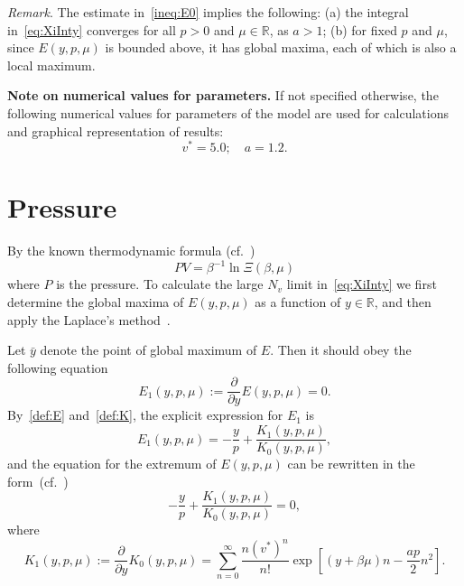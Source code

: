 \documentclass[12pt]{article}
\numberwithin{equation}{section}
\begin{document}
	\textit{Remark}. The estimate in~\eqref{ineq:E0} implies the following: (a) the integral in~\eqref{eq:XiInty} converges for all $p>0$ and $\mu \in \mathbb{R}$, as $a>1$; (b) for fixed $p$ and $\mu$, since $E(y,p,\mu)$ is bounded above, it has global maxima, each of which is also a local maximum.
	
	\textbf{Note on numerical values for parameters.} If not specified otherwise, the following numerical values for parameters of the model are used for calculations and graphical representation of results:
	\begin{equation}
		v^* = 5.0; \quad a = 1.2.
	\end{equation}
	
	
	\section{Pressure}
	By the known thermodynamic formula (cf.~\cite[(2.16)]{KKD20})
	\begin{equation}
		\label{def:eos}
		P V = \beta^{-1} \ln \Xi(\beta, \mu)
	\end{equation}
	where $P$ is the pressure. To calculate the large $N_v$ limit in~\eqref{eq:XiInty} we first determine the global maxima of $E(y,p,\mu)$ as a function of $y \in \mathbb{R}$, and then apply the Laplace's method~\cite{Fedoryuk89}.
	
	Let $\bar{y}$ denote the point of global maximum of $E$. Then it should obey the following equation
	\begin{equation}
		\label{def:E1}
		E_1(y,p,\mu) := \frac{\partial}{\partial y} E(y,p,\mu) = 0.
	\end{equation}
	By~\eqref{def:E} and~\eqref{def:K}, the explicit expression for $E_1$ is
	\begin{equation}
		E_1(y,p,\mu) = -\frac{y}{p} + \frac{K_1(y,p,\mu)}{K_0(y,p,\mu)},
	\end{equation}
	and the equation for the extremum of $E(y,p,\mu)$ can be rewritten in the form~(cf.~\cite[(2.19)]{KKD20})
	\begin{equation}
		\label{eq:bar_y}
		-\frac{y}{p} + \frac{K_1(y,p,\mu)}{K_0(y,p,\mu)} = 0,
	\end{equation}
	where
	\begin{equation}
		K_1(y,p,\mu) := \frac{\partial}{\partial y} K_0(y,p,\mu) = \sum_{n=0}^{\infty} \frac{n (v^*)^n}{n!} \exp[(y+\beta\mu)n - \frac{ap}{2}n^2].
	\end{equation}
	
\end{document}
